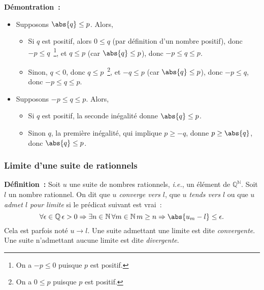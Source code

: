 \noindent\textbf{Démontration :} 
\begin{itemize}[nosep]
    \item Supposons $\abs{q} \leq p$. 
        Alors, 
        \begin{itemize}[nosep]
            \item Si $q$ est positif, alors $0 \leq q$ (par définition d'un nombre positif), donc $-p \leq q$~\footnote{On a $-p \leq 0$ puisque $p$ est positif.}, et $q \leq p$ (car $\abs{q} \leq p$), donc $-p \leq q \leq p$.
            \item Sinon, $q < 0$, donc $q \leq p$~\footnote{On a $0 \leq p$ puisque $p$ est positif.}, et $-q \leq p$ (car $\abs{q} \leq p$), donc $-p \leq q$, donc $-p \leq q \leq p$.
        \end{itemize}
    \item Supposons $-p \leq q \leq p$.
        Alors, 
        \begin{itemize}[nosep]
            \item Si $q$ est positif, la seconde inégalité donne $\abs{q} \leq p$.
            \item Sinon $q$, la première inégalité, qui implique $p \geq -q$, donne $p \geq \abs{q}$, donc $\abs{q} \leq p$.
        \end{itemize}
\end{itemize}

\done

\subsubsection{Limite d'une suite de rationnels}

\noindent\textbf{Définition :} Soit $u$ une suite de nombres rationnels, \emph{i.e.}, un élément de $\mathbb{Q}^{\mathbb{N}}$.
    Soit $l$ un nombre rationnel.
    On dit que \emph{$u$ converge vers $l$}, que \emph{$u$ tends vers $l$} ou que \emph{$u$ admet $l$ pour limite} si le prédicat suivant est vrai : 
    \begin{equation*}
        \forall \epsilon \in \mathbb{Q} \, 
        \epsilon > 0 \Rightarrow
            \exists n \in \mathbb{N} \, 
            \forall m \in \mathbb{N} \, 
            m \geq n \Rightarrow
                \abs{u_m - l} \leq \epsilon .
    \end{equation*}
    Cela est parfois noté $u \rightarrow l$.
    Une suite admettant une limite est dite \emph{convergente}. 
    Une suite n'admettant aucune limite est dite \emph{divergente}. 

